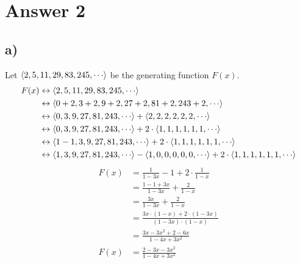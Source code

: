 \documentclass[12pt]{article}
\newcommand{\+}{\mkern2mu}
\begin{document}
\section*{Answer 2}
\subsection*{a) }
Let $\Braket{2, 5, 11, 29, 83, 245, \cdots}$ be the generating function $F(x)$.
\begin{align*}
F(x) &\leftrightarrow \Braket{2, 5, 11, 29, 83, 245, \cdots} \\
&\leftrightarrow \Braket{0+2, 3+2, 9+2, 27+2, 81+2, 243+2, \cdots} \\
&\leftrightarrow \Braket{0, 3, 9, 27, 81, 243, \cdots} + \Braket{2, 2, 2, 2, 2, 2, \cdots} \\
&\leftrightarrow \Braket{0, 3, 9, 27, 81, 243, \cdots} + 2 \cdot \Braket{1, 1, 1, 1, 1, 1, \cdots} \\
&\leftrightarrow \Braket{1-1, 3, 9, 27, 81, 243, \cdots} + 2 \cdot \Braket{1, 1, 1, 1, 1, 1, \cdots} \\
&\leftrightarrow \Braket{1, 3, 9, 27, 81, 243, \cdots} - \Braket{1, 0, 0, 0, 0, 0, \cdots} + 2 \cdot \Braket{1, 1, 1, 1, 1, 1, \cdots}
\end{align*}
\begin{align*}
F(x) &= \frac{1}{1-3x} - 1 + 2 \cdot \frac{1}{1-x} \\
&= \frac{1-1+3x}{1-3x} + \frac{2}{1-x} \\
&= \frac{3x}{1-3x} + \frac{2}{1-x} \\
&= \frac{3x \cdot (1-x) + 2 \cdot (1-3x)}{(1-3x) \cdot (1-x)} \\
&= \frac{3x - 3x^2 + 2 - 6x}{1 - 4x + 3x^2} \\
F(x) &= \frac{2 - 3x - 3x^2}{1 - 4x + 3x^2}
\end{align*}
\end{document}

